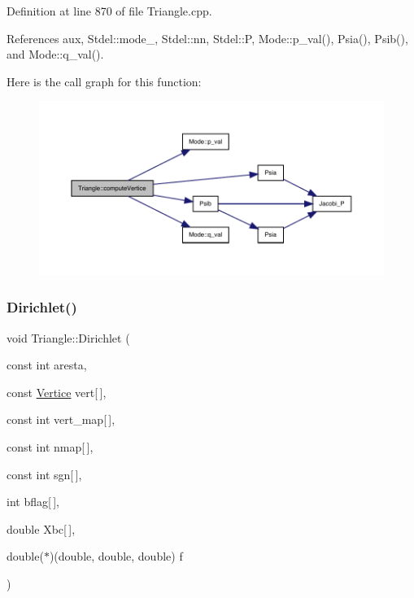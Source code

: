 Definition at line 870 of file Triangle.\+cpp.



References aux, Stdel\+::mode\+\_\+, Stdel\+::nn, Stdel\+::P, Mode\+::p\+\_\+val(), Psia(), Psib(), and Mode\+::q\+\_\+val().

Here is the call graph for this function\+:
\nopagebreak
\begin{figure}[H]
\begin{center}
\leavevmode
\includegraphics[width=350pt]{classTriangle_ac75851696ddabecfc48a784cf9b3ba8a_cgraph}
\end{center}
\end{figure}
\mbox{\label{classTriangle_a8895a8448dcfdefefb94681518530c0f}} 
\subsubsection{\texorpdfstring{Dirichlet()}{Dirichlet()}}
{\footnotesize\ttfamily void Triangle\+::\+Dirichlet (\begin{DoxyParamCaption}\item[{const int}]{aresta,  }\item[{const \hyperlink{structVertice}{Vertice}}]{vert\mbox{[}$\,$\mbox{]},  }\item[{const int}]{vert\+\_\+map\mbox{[}$\,$\mbox{]},  }\item[{const int}]{nmap\mbox{[}$\,$\mbox{]},  }\item[{const int}]{sgn\mbox{[}$\,$\mbox{]},  }\item[{int}]{bflag\mbox{[}$\,$\mbox{]},  }\item[{double}]{Xbc\mbox{[}$\,$\mbox{]},  }\item[{double($\ast$)(double, double, double)}]{f }\end{DoxyParamCaption})\hspace{0.3cm}{\ttfamily [virtual]}}



